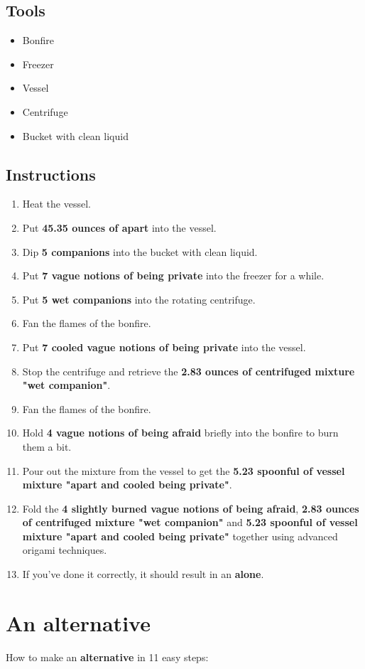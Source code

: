 \documentclass{article}
\begin{document}
\subsection{Tools}\begin{itemize}
\item 
Bonfire
\item 
Freezer
\item 
Vessel
\item 
Centrifuge
\item 
Bucket with clean liquid
\end{itemize}
\subsection{Instructions}\begin{enumerate}
\item 
Heat the vessel.
\item 
Put \textbf{45.35 ounces of apart} into the vessel.
\item 
Dip \textbf{5 companions} into the bucket with clean liquid.
\item 
Put \textbf{7 vague notions of being private} into the freezer for a while.
\item 
Put \textbf{5 wet companions} into the rotating centrifuge.
\item 
Fan the flames of the bonfire.
\item 
Put \textbf{7 cooled vague notions of being private} into the vessel.
\item 
Stop the centrifuge and retrieve the \textbf{2.83 ounces of centrifuged mixture "wet companion"}.
\item 
Fan the flames of the bonfire.
\item 
Hold \textbf{4 vague notions of being afraid} briefly into the bonfire to burn them a bit.
\item 
Pour out the mixture from the vessel to get the \textbf{5.23 spoonful of vessel mixture "apart and cooled being private"}.
\item 
Fold the \textbf{4 slightly burned vague notions of being afraid}, \textbf{2.83 ounces of centrifuged mixture "wet companion"} and \textbf{5.23 spoonful of vessel mixture "apart and cooled being private"} together using advanced origami techniques.
\item 
If you've done it correctly, it should result in an \textbf{alone}.
\end{enumerate}
\newpage
\section{An alternative}How to make an \textbf{alternative} in 11 easy steps:
\end{document}
